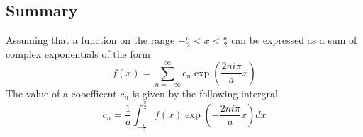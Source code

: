 \subsection{Summary}
\begin{mdframed}
Assuming that a function on the range $-\frac{a}{2}<x<\frac{a}{2}$ can be expressed
as a sum of complex exponentials of the form
\begin{equation*}
f(x)=\sum_{n=-\infty}^{\infty} c_n \exp\left(\frac{2ni\pi}{a}x\right)
\end{equation*}
The value of a cooefficent $c_n$ is given by the following intergral
\begin{equation*}
c_n = \frac{1}{a}\int_{-\frac{a}{2}}^{\frac{a}{2}} f(x) \exp\left(-\frac{2ni\pi}{a}x\right) dx
\end{equation*}
\end{mdframed}
